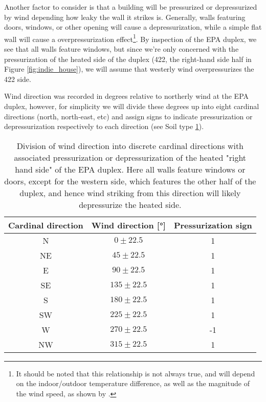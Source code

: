 Another factor to consider is that a building will be pressurized or depressurized by wind depending how leaky the wall it strikes is.
Generally, walls featuring doors, windows, or other opening will cause a depressurization, while a simple flat wall will cause a overpressurization effect\footnote{
It should be noted that this relationship is not always true, and will depend on the indoor/outdoor temperature difference, as well as the magnitude of the wind speed, as shown by \citeauthor{shirazi_three-dimensional_2017}\cite{shirazi_three-dimensional_2017}.
}.
By inspection of the EPA duplex, we see that all walls feature windows, but since we're only concerned with the pressurization of the heated side of the duplex (422, the right-hand side half in Figure \eqref{fig:indie_house}), we will assume that westerly wind overpressurizes the 422 side.\par

Wind direction was recorded in degrees relative to northerly wind at the EPA duplex, however, for simplicity we will divide these degrees up into eight cardinal directions (north, north-east, etc) and assign signs to indicate pressurization or depressurization respectively to each direction (see Soil type \ref{tbl:wind_direction}).\par

\begin{table}[htb!]
  \centering
  \begin{tabular}{c c c}
    \toprule
    Cardinal direction & Wind direction [\si{\degree}] & Pressurization sign \\
    \midrule
    N & $0 \pm 22.5$ & 1 \\
    NE & $45 \pm 22.5$ & 1 \\
    E & $90 \pm 22.5$ & 1 \\
    SE & $135 \pm 22.5$ & 1 \\
    S & $180 \pm 22.5$ & 1 \\
    SW & $225 \pm 22.5$ & 1 \\
    W & $270 \pm 22.5$ & -1 \\
    NW & $315 \pm 22.5$ & 1 \\
    \bottomrule
  \end{tabular}
  \caption[Division of wind direction into discrete cardinal directions with associated pressurization or depressurization of the heated "right hand side" of the EPA duplex.]{Division of wind direction into discrete cardinal directions with associated pressurization or depressurization of the heated "right hand side" of the EPA duplex. Here all walls feature windows or doors, except for the western side, which features the other half of the duplex, and hence wind striking from this direction will likely depressurize the heated side.}
  \label{tbl:wind_direction}
\end{table}

